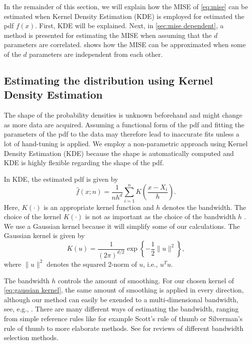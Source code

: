 In the remainder of this section, we will explain how the MISE of \cref{eq:mise} can be estimated when Kernel Density Estimation (KDE) is employed for estimated the pdf $f(x)$. First, KDE will be explained. Next, in \cref{sec:mise dependent}, a method is presented for estimating the MISE when assuming that the $d$ parameters are correlated.  shows how the MISE can be approximated when some of the $d$ parameters are independent from each other.

\subsection{Estimating the distribution using Kernel Density Estimation}
\label{sec:kde}

The shape of the probability densities is unknown beforehand and might change as more data are acquired. Assuming a functional form of the pdf and fitting the parameters of the pdf to the data may therefore lead to inaccurate fits unless a lot of hand-tuning is applied. We employ a non-parametric approach using Kernel Density Estimation (KDE) \cite{rosenblatt1956remarks, parzen1962estimation} because the shape is automatically computed and KDE is highly flexible regarding the shape of the pdf.

In KDE, the estimated pdf is given by
\begin{equation}
	\label{eq:kde}
	\hat{f}(x;n) = \frac{1}{nh^d} \sum_{i=1}^n K\left(\frac{x - X_i}{h}\right).
\end{equation}
Here, $K(\cdot)$ is an appropriate kernel function and $h$ denotes the bandwidth. The choice of the kernel $K(\cdot)$ is not as important as the choice of the bandwidth $h$ \cite{turlach1993bandwidthselection}. We use a Gaussian kernel because it will simplify some of our calculations. The Gaussian kernel is given by
\begin{equation}
	\label{eq:gaussian kernel}
	K(u) = \frac{1}{\left( 2\pi \right)^{d/2}} \exp \left\{ -\frac{1}{2} \|u\|^2 \right\},
\end{equation}
where $\|u\|^2$ denotes the squared 2-norm of $u$, i.e., $u^T u$.

The bandwidth $h$ controls the amount of smoothing. For our chosen kernel of \cref{eq:gaussian kernel}, the same amount of smoothing is applied in every direction, although our method can easily be exended to a multi-dimensional bandwidth, see, e.g., \textcite{chen2017tutorial}. There are many different ways of estimating the bandwidth, ranging from simple reference rules like for example Scott's rule of thumb \cite{scott2015multivariate} or Silverman's rule of thumb \cite{silverman1986density} to more elaborate methods. See \textcite{turlach1993bandwidthselection, bashtannyk2001bandwidth, jones1996brief, chiu1996comparative} for reviews of different bandwidth selection methods. 

